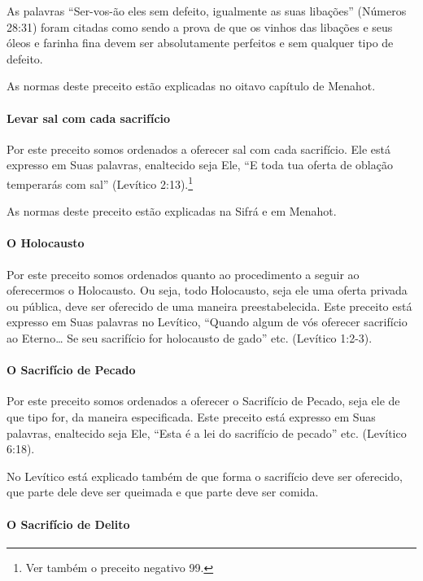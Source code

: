 As palavras ``Ser-vos-ão eles sem defeito, igualmente as suas libações''
(Números 28:31) foram citadas como sendo a prova de que os vinhos das
libações e seus óleos e farinha fina devem ser absolutamente perfeitos
e sem qualquer tipo de defeito.

As normas deste preceito estão explicadas no oitavo capítulo de Menahot.

\paragraph{Levar sal com cada sacrifício}

Por este preceito somos ordenados a oferecer sal com cada sacrifício.
Ele está expresso em Suas palavras, enaltecido seja Ele, ``E toda tua
oferta de oblação temperarás com sal'' (Levítico
2:13).\footnote{Ver também o preceito negativo 99.}

As normas deste preceito estão explicadas na Sifrá e em Menahot.

\paragraph{O Holocausto}

Por este preceito somos ordenados quanto ao procedimento a seguir ao
oferecermos o Holocausto. Ou seja, todo Holocausto, seja ele uma oferta
privada ou pública, deve ser oferecido de uma maneira preestabelecida.
Este preceito está expresso em Suas palavras no Levítico, ``Quando algum
de vós oferecer sacrifício ao Eterno\ldots{} Se seu sacrifício for holocausto
de gado'' etc. (Levítico 1:2-3).

\paragraph{O Sacrifício de Pecado}

Por este preceito somos ordenados a oferecer o Sacrifício de Pecado,
seja ele de que tipo for, da maneira especificada. Este preceito está
expresso em Suas palavras, enaltecido seja Ele, ``Esta é a lei do
sacrifício de pecado'' etc. (Levítico 6:18).

No Levítico está explicado também de que forma o sacrifício deve ser
oferecido, que parte dele deve ser queimada e que parte deve ser comida.

\paragraph{O Sacrifício de Delito}

